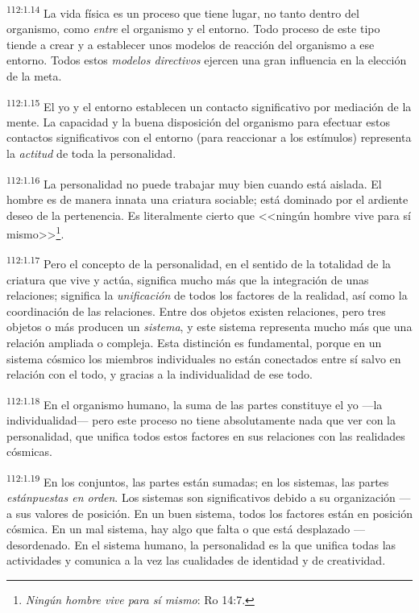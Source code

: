 \par
\textsuperscript{112:1.14} La vida física es un proceso que tiene lugar, no tanto dentro del organismo, como \textit{entre} el organismo y el entorno. Todo proceso de este tipo tiende a crear y a establecer unos modelos de reacción del organismo a ese entorno. Todos estos \textit{modelos directivos} ejercen una gran influencia en la elección de la meta.

\par
\textsuperscript{112:1.15} El yo y el entorno establecen un contacto significativo por mediación de la mente. La capacidad y la buena disposición del organismo para efectuar estos contactos significativos con el entorno (para reaccionar a los estímulos) representa la \textit{actitud} de toda la personalidad.

\par
\textsuperscript{112:1.16} La personalidad no puede trabajar muy bien cuando está aislada. El hombre es de manera innata una criatura sociable; está dominado por el ardiente deseo de la pertenencia. Es literalmente cierto que <<ningún hombre vive para sí mismo>>\footnote{\textit{Ningún hombre vive para sí mismo}: Ro 14:7.}.

\par
\textsuperscript{112:1.17} Pero el concepto de la personalidad, en el sentido de la totalidad de la criatura que vive y actúa, significa mucho más que la integración de unas relaciones; significa la \textit{unificación} de todos los factores de la realidad, así como la coordinación de las relaciones. Entre dos objetos existen relaciones, pero tres objetos o más producen un \textit{sistema}, y este sistema representa mucho más que una relación ampliada o compleja. Esta distinción es fundamental, porque en un sistema cósmico los miembros individuales no están conectados entre sí salvo en relación con el todo, y gracias a la individualidad de ese todo.

\par
\textsuperscript{112:1.18} En el organismo humano, la suma de las partes constituye el yo ---la individualidad--- pero este proceso no tiene absolutamente nada que ver con la personalidad, que unifica todos estos factores en sus relaciones con las realidades cósmicas.

\par
\textsuperscript{112:1.19} En los conjuntos, las partes están sumadas; en los sistemas, las partes \textit{estánpuestas en orden}. Los sistemas son significativos debido a su organización ---a sus valores de posición. En un buen sistema, todos los factores están en posición cósmica. En un mal sistema, hay algo que falta o que está desplazado ---desordenado. En el sistema humano, la personalidad es la que unifica todas las actividades y comunica a la vez las cualidades de identidad y de creatividad.

